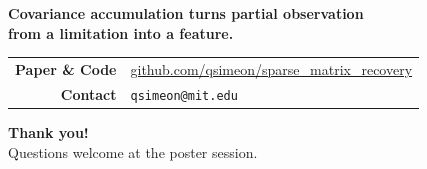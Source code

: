 \documentclass[aspectratio=169,12pt]{beamer}
\begin{document}
\begin{frame}[plain]
\vfill
\begin{center}
  {\large\color{mainblue}\bfseries
    Covariance accumulation turns partial observation\\[2pt]
    from a limitation into a feature.}

  \vspace{16pt}

  \renewcommand{\arraystretch}{1.4}
  \begin{tabular}{rl}
    {\color{accentblue}\textbf{Paper \& Code}} &
      \url{github.com/qsimeon/sparse_matrix_recovery} \\
    {\color{accentblue}\textbf{Contact}} &
      \texttt{qsimeon@mit.edu} \\
  \end{tabular}

  \vspace{16pt}
  {\LARGE\color{mainblue}\textbf{Thank you!}}\\[4pt]
  {\normalsize\color{medgray} Questions welcome at the poster session.}
\end{center}
\vfill
\end{frame}
\end{document}
